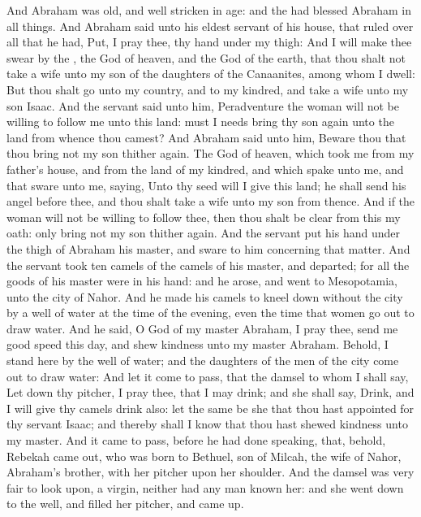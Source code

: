 \begin{biblechapter} %
 And Abraham was old, and well stricken in age: and the \LORD had blessed Abraham in all things.
\verse And Abraham said unto his eldest servant of his house, that ruled over all that he had, Put, I pray thee, thy hand under my thigh:
\verse And I will make thee swear by the \LORD, the God of heaven, and the God of the earth, that thou shalt not take a wife unto my son of the daughters of the Canaanites, among whom I dwell:
\verse But thou shalt go unto my country, and to my kindred, and take a wife unto my son Isaac.
\verse And the servant said unto him, Peradventure the woman will not be willing to follow me unto this land: must I needs bring thy son again unto the land from whence thou camest?
\verse And Abraham said unto him, Beware thou that thou bring not my son thither again.
\verse The \LORD God of heaven, which took me from my father's house, and from the land of my kindred, and which spake unto me, and that sware unto me, saying, Unto thy seed will I give this land; he shall send his angel before thee, and thou shalt take a wife unto my son from thence.
\verse And if the woman will not be willing to follow thee, then thou shalt be clear from this my oath: only bring not my son thither again.
\verse And the servant put his hand under the thigh of Abraham his master, and sware to him concerning that matter.
\verse And the servant took ten camels of the camels of his master, and departed; for all the goods of his master were in his hand: and he arose, and went to Mesopotamia, unto the city of Nahor.
\verse And he made his camels to kneel down without the city by a well of water at the time of the evening, even the time that women go out to draw water.
\verse And he said, O \LORD God of my master Abraham, I pray thee, send me good speed this day, and shew kindness unto my master Abraham.
\verse Behold, I stand here by the well of water; and the daughters of the men of the city come out to draw water:
\verse And let it come to pass, that the damsel to whom I shall say, Let down thy pitcher, I pray thee, that I may drink; and she shall say, Drink, and I will give thy camels drink also: let the same be she that thou hast appointed for thy servant Isaac; and thereby shall I know that thou hast shewed kindness unto my master.
\verse And it came to pass, before he had done speaking, that, behold, Rebekah came out, who was born to Bethuel, son of Milcah, the wife of Nahor, Abraham's brother, with her pitcher upon her shoulder.
\verse And the damsel was very fair to look upon, a virgin, neither had any man known her: and she went down to the well, and filled her pitcher, and came up.

\end{biblechapter}
